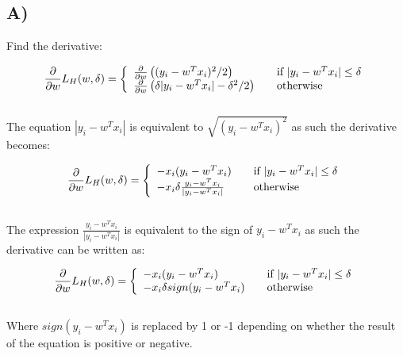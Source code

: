 \documentclass{report}
\begin{document}
\subsection*{A)}
Find the derivative:

\begin{equation}
  \frac{\partial}{\partial w} L_H(w, \delta) = \left\{
  \begin{array}{l l}
    \frac{\partial}{\partial w} \left((y_i - w^Tx_i)^2 / 2 \right)& \quad \text{if }  | y_i - w^Tx_i | \leq \delta\\
    \frac{\partial}{\partial w} \left(\delta | y_i - w^Tx_i | - \delta^2 / 2\right) & \quad \text{otherwise}

  \end{array} \right.\end{equation}
  \\
  
The equation $| y_i - w^Tx_i |$ is equivalent to $\sqrt{( y_i - w^Tx_i )^2}$ as such
the derivative becomes:

  \begin{equation}
    \frac{\partial}{\partial w} L_H(w, \delta) = \left\{
    \begin{array}{l l}
      - x_i (y_i - w^Tx_i)  & \quad \text{if }  | y_i - w^Tx_i | \leq \delta\\
      - x_i \delta \frac{y_i - w^Tx_i}{| y_i - w^Tx_i |}  & \quad \text{otherwise}

    \end{array} \right.\end{equation}
    \\

The expression $\frac{y_i - w^Tx_i}{| y_i - w^Tx_i |}$ is equivalent to the sign
of $y_i - w^Tx_i$ as such the derivative can be written as:

\begin{equation}
  \frac{\partial}{\partial w} L_H(w, \delta) = \left\{
  \begin{array}{l l}
    - x_i (y_i - w^Tx_i) & \quad \text{if }  | y_i - w^Tx_i | \leq \delta\\
    - x_i \delta sign ( y_i - w^Tx_i ) & \quad \text{otherwise}

  \end{array} \right.\end{equation}
  \\

Where $sign(y_i - w^Tx_i)$ is replaced by 1 or -1 depending on whether the result of the
equation is positive or negative.
\end{document}
